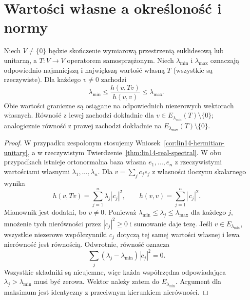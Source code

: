 \section{Wartości własne a określoność i normy}
\label{sec:lin14-rayleigh}

\begin{twierdzenie}
\label{thm:lin14-rayleigh}
Niech \(V\ne\{0\}\) będzie
skończenie wymiarową
przestrzenią euklidesową
lub unitarną, a
\(T\colon V\to V\) operatorem
samosprzężonym.
Niech \(\lambda_{\min}\)
i \(\lambda_{\max}\)
oznaczają odpowiednio
najmniejszą i największą
wartość własną \(T\)
(wszystkie są rzeczywiste).
Dla każdego \(v\ne0\)
zachodzi
\[
 \lambda_{\min}
 \le \frac{h(v,Tv)}{h(v,v)}
 \le \lambda_{\max}.
\]
Obie wartości graniczne
są osiągane na odpowiednich
niezerowych wektorach własnych.
Równość z lewej zachodzi
dokładnie dla
\(v\in E_{\lambda_{\min}}(T)\setminus\{0\}\);
analogicznie równość z prawej
zachodzi dokładnie na
\(E_{\lambda_{\max}}(T)\setminus\{0\}\).
\end{twierdzenie}
\begin{proof}
W przypadku zespolonym
stosujemy
Wniosek~\ref{cor:lin14-hermitian-unitary},
a w rzeczywistym
Twierdzenie~\ref{thm:lin14-real-spectral}.
W obu przypadkach istnieje
ortonormalna baza własna
\(e_1,\ldots,e_n\)
z rzeczywistymi wartościami
własnymi \(\lambda_1,\ldots,\lambda_n\).
Dla \(v=\sum_jc_je_j\)
z własności iloczynu skalarnego
wynika
\[
 h(v,Tv)=\sum_{j=1}^n
                      \lambda_j|c_j|^2,
 \qquad
 h(v,v)=\sum_{j=1}^n|c_j|^2.
\]
Mianownik jest dodatni,
bo \(v\ne0\).
Ponieważ
\(\lambda_{\min}\le\lambda_j
\le\lambda_{\max}\)
dla każdego \(j\), mnożenie
tych nierówności przez
\(|c_j|^2\ge0\) i sumowanie
daje tezę.
Jeśli \(v\in E_{\lambda_{\min}}\),
wszystkie niezerowe współczynniki
\(c_j\) dotyczą tej samej
wartości własnej i lewa
nierówność jest równością.
Odwrotnie, równość oznacza
\[
 \sum_j(\lambda_j-\lambda_{\min})
                         |c_j|^2=0.
\]
Wszystkie składniki są
nieujemne, więc każda
współrzędna odpowiadająca
\(\lambda_j>\lambda_{\min}\)
musi być zerowa.
Wektor należy zatem
do \(E_{\lambda_{\min}}\).
Argument dla maksimum jest
identyczny z przeciwnym
kierunkiem nierówności.
\end{proof}

